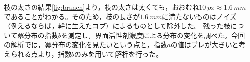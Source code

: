\documentclass[autodetect-engine,dvi=dvipdfmx,a4paper,ja=standard,oneside,openany,11pt]{bxjsbook}
\begin{document}
枝の太さの結果\ref{fig:branch}より，枝の太さは太くても，おおむね$\SI{10}{px}\approx\SI{1.6}{mm}$であることがわかる。そのため，枝の長さが$\SI{1.6}{mm}$に満たないものはノイズ（例えるならば，幹に生えたコブ）によるものとして除外した。
残った枝について冪分布の指数$b$を測定し，界面活性剤濃度による分布の変化を調べた。今回の解析では，冪分布の変化を見たいという点と，指数$a$の値はブレが大きいと考えられる点より，指数$b$のみを用いて解析を行った。

\ifdraft{
  
  
}{}
\end{document}
